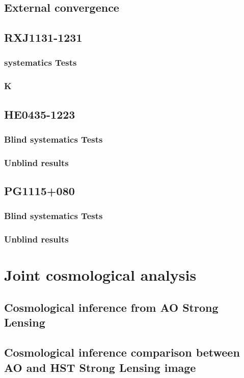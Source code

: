 \documentclass[fleqn,usenatbib]{mnras}
\begin{document}
\subsection{External convergence}

\subsection{RXJ1131-1231}
\subsubsection{systematics Tests}
\subsubsection{K}
\subsection{HE0435-1223}
\subsubsection{Blind systematics Tests}
\subsubsection{Unblind results}
\subsection{PG1115+080}
\subsubsection{Blind systematics Tests}
\subsubsection{Unblind results}
\section{Joint cosmological analysis}
\subsection{Cosmological inference from AO Strong Lensing}
\subsection{Cosmological inference comparison between AO and HST Strong Lensing image}
\end{document}
